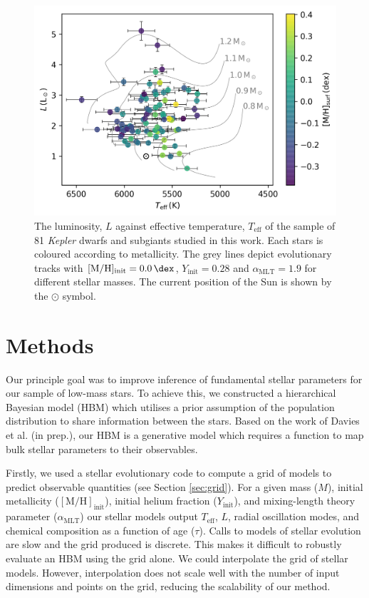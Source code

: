\documentclass[a4paper,fleqn,usenatbib]{mnras}
\newcommand{\metallicity}{\ensuremath{[\mathrm{M}/\mathrm{H}]}}
\newcommand{\teff}{\ensuremath{T_\mathrm{eff}}}
\newcommand{\mlt}{\ensuremath{{\alpha_\mathrm{MLT}}}}
\begin{document}
\begin{figure}
    \centering
    \includegraphics[width=\linewidth]{figures/context.png}
    \caption{The luminosity, $L$ against effective temperature, $\teff$ of the sample of 81 \emph{Kepler} dwarfs and subgiants studied in this work. Each stars is coloured according to metallicity. The grey lines depict evolutionary tracks with $\metallicity_\mathrm{init}=\SI{0.0}{\dex}$, $Y_\mathrm{init}=0.28$ and $\mlt=1.9$ for different stellar masses. The current position of the Sun is shown by the $\odot$ symbol.}
    \label{fig:data}
\end{figure}

\section{Methods}\label{sec:meth}


Our principle goal was to improve inference of fundamental stellar parameters for our sample of low-mass stars. To achieve this, we constructed a hierarchical Bayesian model (HBM) which utilises a prior assumption of the population distribution to share information between the stars. Based on the work of Davies et al. (in prep.), our HBM is a generative model which requires a function to map bulk stellar parameters to their observables.

Firstly, we used a stellar evolutionary code to compute a grid of models to predict observable quantities (see Section \ref{sec:grid}). For a given mass ($M$), initial metallicity ($\metallicity_\mathrm{init}$), initial helium fraction ($Y_\mathrm{init}$), and mixing-length theory parameter ($\mlt$) our stellar models output $\teff$, $L$, radial oscillation modes, and chemical composition as a function of age ($\tau$). Calls to models of stellar evolution are slow and the grid produced is discrete. This makes it difficult to robustly evaluate an HBM using the grid alone. We could interpolate the grid of stellar models. However, interpolation does not scale well with the number of input dimensions and points on the grid, reducing the scalability of our method.
\end{document}
